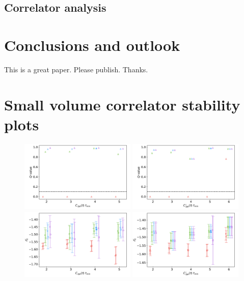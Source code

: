 \documentclass[prd,aps,twocolumn,superscriptaddress,tightenlines,nofootinbib,floatfix,preprintnumbers,10pt]{revtex4-1}
\begin{document}
\subsection{Correlator analysis}


\section{Conclusions and outlook}
This is a great paper. Please publish. Thanks.

\appendix

\newpage
\onecolumngrid
\section{Small volume correlator stability plots}
\begin{figure}[h]{
		\includegraphics[width=0.49\textwidth]{plots/figures/2pt_Q.pdf}
		\includegraphics[width=0.49\textwidth]{plots/figures/d2pt_Q.pdf}
		\includegraphics[width=0.49\textwidth]{plots/figures/2pt_dZ0.pdf}
		\includegraphics[width=0.49\textwidth]{plots/figures/d2pt_dZ0.pdf}
}
\end{figure}
\end{document}
